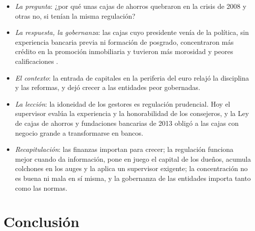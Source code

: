 \documentclass[11pt]{article}
\begin{document}
\begin{itemize}
\item \emph{La pregunta}: ¿por qué unas cajas de ahorros quebraron en la crisis de 2008 y otras no, si tenían la misma regulación?
\item \emph{La respuesta, la gobernanza}: las cajas cuyo presidente venía de la política, sin experiencia bancaria previa ni formación de posgrado, concentraron más crédito en la promoción inmobiliaria y tuvieron más morosidad y peores calificaciones\nocite{CunatGaricano2010} .
\item \emph{El contexto}: la entrada de capitales en la periferia del euro relajó la disciplina y las reformas, y dejó crecer a las entidades peor gobernadas\nocite{FernandezVillaverdeGaricanoSantos2013}.
\item \emph{La lección}: la idoneidad de los gestores es regulación prudencial. Hoy el supervisor evalúa la experiencia y la honorabilidad de los consejeros, y la Ley de cajas de ahorros y fundaciones bancarias de 2013 obligó a las cajas con negocio grande a transformarse en bancos.
\end{itemize}

\begin{itemize}
\item \emph{Recapitulación}: las finanzas importan para crecer; la regulación funciona mejor cuando da información, pone en juego el capital de los dueños, acumula colchones en los auges y la aplica un supervisor exigente; la concentración no es buena ni mala en sí misma, y la gobernanza de las entidades importa tanto como las normas.
\end{itemize}

\section*{Conclusión}
\end{document}

